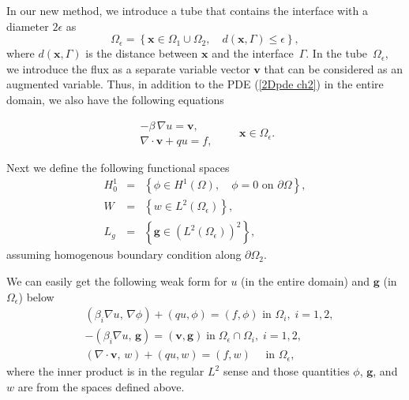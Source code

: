 \documentclass[11pt]{article}
\numberwithin{equation}{section}
\begin{document}
In our new method, we introduce a tube  that contains the interface with a diameter $2 \epsilon$ as
\begin{equation*}
  \Omega_{\epsilon} = \left \{ \mathbf{x}\in \Omega_1 \cup \Omega_2, \quad d(\mathbf{x},\Gamma ) \le \epsilon \right\},
\end{equation*}
where $d(\mathbf{x},\Gamma )$ is the distance between $\mathbf{x}$ and the interface~$\Gamma$.
In the tube~$\Omega_{\epsilon}$,
we introduce the flux as a separate variable vector $\mathbf{v}$
that can be considered as an augmented variable.
Thus, in addition to the PDE (\ref{2Dpde ch2}) in the entire domain,
we also have the following equations

\begin{equation*}
\begin{array}{c}
   -\beta \, \nabla u = \mathbf{v},    \\
    \nabla \cdot \mathbf{v} + q u = f ,
 \end{array}
\qquad \mathbf{x} \in \Omega_{\epsilon}.
\end{equation*}

Next we  define the following functional spaces
\begin{eqnarray*}
H_0^1 &=& \left\{\phi \in H^1(\Omega), \quad \phi = 0 \text{ on } \partial\Omega  \right\},\\
W & =& \left\{ w\in L^2(\Omega_{\epsilon}) \right\}, \\
L_g &=& \left \{\mathbf{g} \in (L^2(\Omega_{\epsilon}))^2 \right\},
\end{eqnarray*}
assuming homogenous boundary condition along $\partial\Omega_2$.


We can easily get the following weak form for $u$ (in the entire domain) and $\mathbf{g}$ (in $\Omega_{\epsilon}$) below
\begin{eqnarray}
 &   \left(\beta_i \nabla u, \, \nabla \phi \right) + \left(q u, \phi\right) = \left(f, \phi\right)  \text{ in } \Omega_i, \;  i=1, 2, \\
 &  -\left(\beta_i \nabla u, \, \mathbf{g}\right) = \left(\mathbf{v}, \mathbf{g}\right) \;  \text{in} \; \Omega_{\epsilon}\cap \Omega_{i}, \; i=1,2, \label{poi2}\\
 &  \left(\nabla \cdot \mathbf{v},\, w\right) + (q u, w) = \left(f, w \right) \quad \text{ in } \Omega_{\epsilon}, \label{poi3}
\end{eqnarray}
where the inner product is in the regular $L^2$ sense and those quantities  $\phi$, $\mathbf{g}$, and $w$ are from the spaces defined above.
\end{document}
